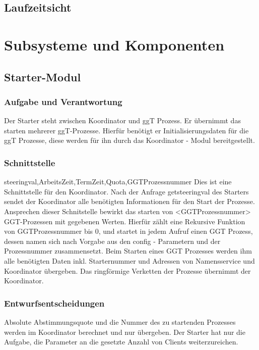 \documentclass{article}
\begin{document}
\subsection{Laufzeitsicht}

\newpage

\section{Subsysteme und Komponenten}

\subsection{Starter-Modul}
\subsubsection{Aufgabe und Verantwortung}

Der Starter steht zwischen Koordinator und ggT Prozess. Er übernimmt das starten mehrerer ggT-Prozesse.
Hierfür benötigt er Initialisierungsdaten für die ggT Prozesse, diese werden für ihn durch das Koordinator - Modul
bereitgestellt.


\subsubsection{Schnittstelle}
{steeringval,ArbeitsZeit,TermZeit,Quota,GGTProzessnummer}
Dies ist eine Schnittstelle für den Koordinator. Nach der Anfrage getsteeringval des Starters sendet der Koordinator alle
benötigten Informationen für den Start der Prozesse. Ansprechen dieser Schnitstelle bewirkt das starten von <GGTProzessnummer>
GGT-Prozessen mit gegebenen Werten.
Hierfür zählt eine Rekursive Funktion von GGTProzessnummer bis 0, und startet in jedem Aufruf einen GGT Prozess,
dessen namen sich nach Vorgabe aus den config - Parametern und der Prozessnummer zusammensetzt.
Beim Starten eines GGT Prozesses werden ihm alle benötigten Daten inkl. Starternummer und Adressen von Namensservice und
Koordinator übergeben. Das ringförmige Verketten der Prozesse übernimmt der Koordinator.

\subsubsection{Entwurfsentscheidungen}
Absolute Abstimmungsquote und die Nummer des zu startenden Prozesses werden im Koordinator berechnet und nur übergeben.
Der Starter hat nur die Aufgabe, die Parameter an die gesetzte Anzahl von Clients weiterzureichen.
\end{document}
